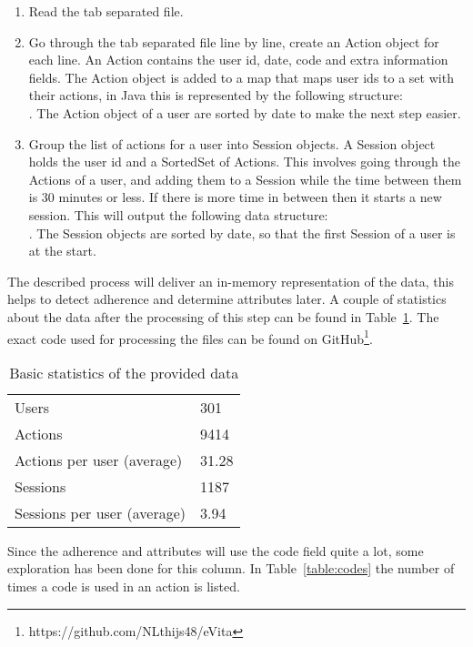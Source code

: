 \begin{enumerate}
	\item Read the tab separated file.
	\item Go through the tab separated file line by line, create an Action object for each line. An Action contains the user id, date, code and extra information fields. The Action object is added to a map that maps user ids to a set with their actions, in Java this is represented by the following structure:\\ . The Action object of a user are sorted by date to make the next step easier.
	\item Group the list of actions for a user into Session objects. A Session object holds the user id and a SortedSet of Actions. This involves going through the Actions of a user, and adding them to a Session while the time between them is 30 minutes or less. If there is more time in between then it starts a new session. This will output the following data structure:\\ . The Session objects are sorted by date, so that the first Session of a user is at the start.
\end{enumerate}

The described process will deliver an in-memory representation of the data, this helps to detect adherence and determine attributes later. A couple of statistics about the data after the processing of this step can be found in Table~\ref{table:dataStats}. The exact code used for processing the files can be found on GitHub\footnote{https://github.com/NLthijs48/eVita}.

\begin{table}[]
	\centering
	\caption{Basic statistics of the provided data}
	\label{table:dataStats}
	\begin{tabular}{@{}ll@{}}
		\toprule
		Users                       & 301   \\
		Actions                     & 9414  \\
		Actions per user (average)  & 31.28 \\
		Sessions                    & 1187  \\
		Sessions per user (average) & 3.94  \\ \bottomrule
	\end{tabular}
\end{table}

Since the adherence and attributes will use the code field quite a lot, some exploration has been done for this column. In Table~\ref{table:codes} the number of times a code is used in an action is listed.

